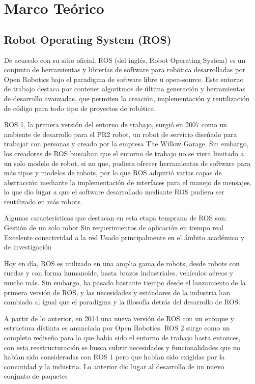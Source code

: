 \chapter{Marco Teórico}


\section{Robot Operating System (ROS)}

De acuerdo con su sitio oficial, ROS (del inglés, Robot Operating System) es un conjunto de herramientas y librerías de software para robótica desarrolladas por Open Robotics bajo el paradigma de software libre u open-source. Este entorno de trabajo destaca por contener algoritmos de última generación y herramientas de desarrollo avanzadas,  que permiten la creación, implementación y reutilización de código para todo tipo de proyectos de robótica.

ROS 1, la primera versión del entorno de trabajo, surgió en 2007 como un ambiente de desarrollo para el PR2 robot, un robot de servicio diseñado para trabajar con personas y creado por la empresa The Willow Garage. Sin embargo, los creadores de ROS buscaban que el entorno de trabajo no se viera limitado a un solo modelo de robot, si no que, pudiera ofrecer herramientas de software para más tipos y modelos de robots, por lo que ROS adquirió varias capas de abstracción mediante la implementación de interfaces para el manejo de mensajes, lo que dio lugar a que el software desarrollado mediante ROS pudiera ser reutilizado en más robots.   

Algunas características que destacan en esta etapa temprana de ROS son:
Gestión de un solo robot
Sin requerimientos de aplicación en tiempo real
Excelente conectividad a la red
Usado principalmente en el ámbito académico y de investigación

Hoy en día, ROS es utilizado en una amplia gama de robots, desde robots con ruedas y con forma humanoide, hasta brazos industriales, vehículos aéreos y mucho más. Sin embargo, ha pasado bastante tiempo desde el lanzamiento de la primera versión de ROS, y las necesidades y estándares de la industria han cambiado al igual que el paradigma y la filosofía detrás del desarrollo de ROS.
   
A partir de lo anterior, en 2014 una nueva versión de ROS con un enfoque y estructura distinta es anunciada por Open Robotics.  ROS 2 surge como un completo rediseño para lo que había sido el entorno de trabajo hasta entonces, con esta reestructuración se busca cubrir necesidades y funcionalidades que no habían sido consideradas con  ROS 1 pero que habían sido exigidas por la comunidad y la industria. Lo anterior dio lugar al desarrollo de un nuevo conjunto de paquetes  
